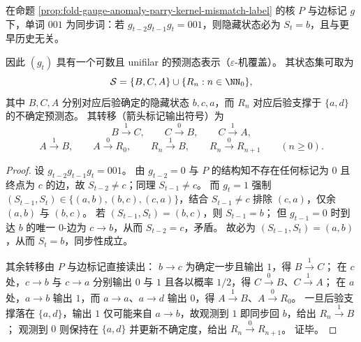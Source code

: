 \begin{theorem}\label{thm:fold-gauge-anomaly-epsilon-machine-synchronizing-word}
在命题 \ref{prop:fold-gauge-anomaly-parry-kernel-mismatch-label} 的核 \(P\) 与边标记 \(g\) 下，单词 \(001\) 为同步词：若 \(g_{t-2}g_{t-1}g_t=001\)，则隐藏状态必为 \(S_t=b\)，且与更早历史无关。
\par
因此 \((g_t)\) 具有一个可数且 unifilar 的预测态表示（\(\varepsilon\)-机覆盖）。
其状态集可取为
\[
\mathcal S=\{B,C,A\}\cup\{R_n:n\in\NN_0\},
\]
其中 \(B,C,A\) 分别对应后验确定的隐藏状态 \(b,c,a\)，而 \(R_n\) 对应后验支撑于 \(\{a,d\}\) 的不确定预测态。
其转移（箭头标记输出符号）为
\[
B \xrightarrow{1} C,\qquad
C \xrightarrow{0} B,\qquad C \xrightarrow{1} A,
\]
\[
A \xrightarrow{1} B,\qquad A \xrightarrow{0} R_0,
\qquad
R_n \xrightarrow{1} B,\qquad R_n \xrightarrow{0} R_{n+1}\qquad(n\ge 0).
\]
\end{theorem}
\begin{proof}
设 \(g_{t-2}g_{t-1}g_t=001\)。
由 \(g_{t-2}=0\) 与 \(P\) 的结构知不存在任何标记为 \(0\) 且终点为 \(c\) 的边，故 \(S_{t-2}\neq c\)；同理 \(S_{t-1}\neq c\)。
而 \(g_t=1\) 强制 \((S_{t-1},S_t)\in\{(a,b),(b,c),(c,a)\}\)，结合 \(S_{t-1}\neq c\) 排除 \((c,a)\)，仅余 \((a,b)\) 与 \((b,c)\)。
若 \((S_{t-1},S_t)=(b,c)\)，则 \(S_{t-1}=b\)；
但 \(g_{t-1}=0\) 时到达 \(b\) 的唯一 \(0\)-边为 \(c\to b\)，从而 \(S_{t-2}=c\)，矛盾。
故必为 \((S_{t-1},S_t)=(a,b)\)，从而 \(S_t=b\)，同步性成立。
\par
其余转移由 \(P\) 与边标记直接读出：
\(b\to c\) 为确定一步且输出 \(1\)，得 \(B\xrightarrow{1}C\)；
在 \(c\) 处，\(c\to b\) 与 \(c\to a\) 分别输出 \(0\) 与 \(1\) 且各以概率 \(1/2\)，得 \(C\xrightarrow{0}B\)、\(C\xrightarrow{1}A\)；
在 \(a\) 处，\(a\to b\) 输出 \(1\)，而 \(a\to a\)、\(a\to d\) 输出 \(0\)，得 \(A\xrightarrow{1}B\)、\(A\xrightarrow{0}R_0\)。
一旦后验支撑落在 \(\{a,d\}\)，输出 \(1\) 仅可能来自 \(a\to b\)，故观测到 \(1\) 即同步回 \(b\)，给出 \(R_n\xrightarrow{1}B\)；
观测到 \(0\) 则保持在 \(\{a,d\}\) 并更新不确定度，给出 \(R_n\xrightarrow{0}R_{n+1}\)。
证毕。
\end{proof}

